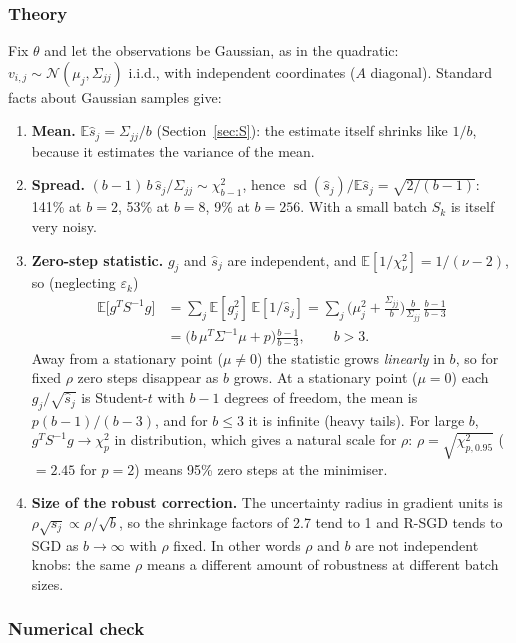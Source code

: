 \documentclass[11pt,a4paper]{article}
\newcommand{\E}{\mathbb{E}}
\begin{document}
\subsubsection*{Theory}

Fix $\theta$ and let the observations be Gaussian, as in the quadratic:
$v_{i,j}\sim\mathcal N(\mu_j,\Sigma_{jj})$ i.i.d., with independent coordinates
($A$ diagonal). Standard facts about Gaussian samples give:
\begin{enumerate}
\item \textbf{Mean.} $\E\widehat s_j=\Sigma_{jj}/b$ (Section~\ref{sec:S}): the estimate itself
shrinks like $1/b$, because it estimates the variance of the mean.
\item \textbf{Spread.} $(b-1)\,b\,\widehat s_j/\Sigma_{jj}\sim\chi^2_{b-1}$, hence
$\operatorname{sd}(\widehat s_j)/\E\widehat s_j=\sqrt{2/(b-1)}$: 141\% at $b=2$, 53\% at
$b=8$, 9\% at $b=256$. With a small batch $S_k$ is itself very noisy.
\item \textbf{Zero-step statistic.} $g_j$ and $\widehat s_j$ are independent, and
$\E[1/\chi^2_\nu]=1/(\nu-2)$, so (neglecting $\varepsilon_k$)
\begin{align*}
\E\big[g^TS^{-1}g\big]&=\sum_j\E[g_j^2]\,\E[1/\widehat s_j]
=\sum_j\Big(\mu_j^2+\frac{\Sigma_{jj}}b\Big)\frac{b}{\Sigma_{jj}}\,\frac{b-1}{b-3}\\
&=\big(b\,\mu^T\Sigma^{-1}\mu+p\big)\frac{b-1}{b-3},\qquad b>3 .
\end{align*}
Away from a stationary point ($\mu\ne0$) the statistic grows \emph{linearly} in $b$, so
for fixed $\rho$ zero steps disappear as $b$ grows. At a stationary point ($\mu=0$)
each $g_j/\sqrt{\widehat s_j}$ is Student-$t$ with $b-1$ degrees of freedom, the mean is
$p(b-1)/(b-3)$, and for $b\le3$ it is infinite (heavy tails). For large $b$,
$g^TS^{-1}g\to\chi^2_p$ in distribution, which gives a natural scale for $\rho$:
$\rho=\sqrt{\chi^2_{p,0.95}}$ ($=2.45$ for $p=2$) means 95\% zero steps at the minimiser.
\item \textbf{Size of the robust correction.} The uncertainty radius in gradient
units is $\rho\sqrt{s_j}\propto\rho/\sqrt b$, so the shrinkage factors of 2.7 tend to 1
and R-SGD tends to SGD as $b\to\infty$ with $\rho$ fixed. In other words $\rho$ and $b$
are not independent knobs: the same $\rho$ means a different amount of robustness at
different batch sizes.
\end{enumerate}

\subsubsection*{Numerical check}
\end{document}
